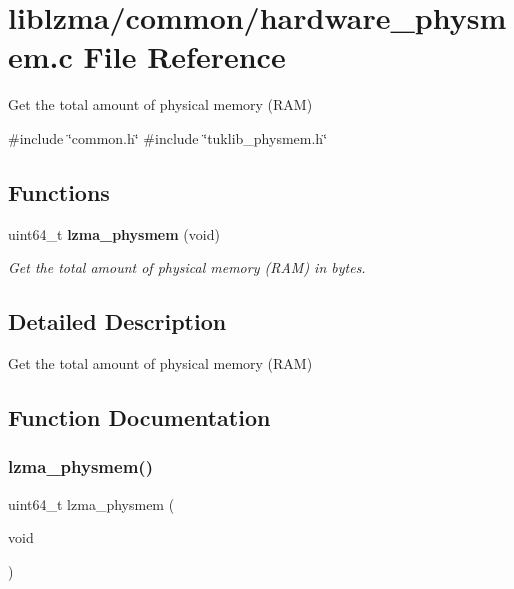 \section{liblzma/common/hardware\+\_\+physmem.c File Reference}
\label{hardware__physmem_8c}


Get the total amount of physical memory (R\+AM)  


{\ttfamily \#include \char`\"{}common.\+h\char`\"{}}\newline
{\ttfamily \#include \char`\"{}tuklib\+\_\+physmem.\+h\char`\"{}}\newline
\subsection*{Functions}
\begin{DoxyCompactItemize}
\item 
uint64\+\_\+t \textbf{ lzma\+\_\+physmem} (void)
\begin{DoxyCompactList}\small\item\em Get the total amount of physical memory (R\+AM) in bytes. \end{DoxyCompactList}\end{DoxyCompactItemize}


\subsection{Detailed Description}
Get the total amount of physical memory (R\+AM) 



\subsection{Function Documentation}
\mbox{\label{hardware__physmem_8c_a8ee2d2a1660609ae1abbf3667b3b0945}} 
\subsubsection{lzma\+\_\+physmem()}
{\footnotesize\ttfamily uint64\+\_\+t lzma\+\_\+physmem (\begin{DoxyParamCaption}\item[{void}]{ }\end{DoxyParamCaption})}




